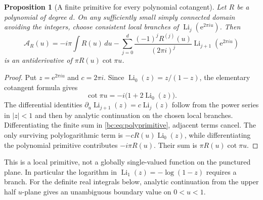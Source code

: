 \documentclass[11pt,letterpaper]{article}
\numberwithin{equation}{section}
\newtheorem{proposition}[theorem]{Proposition}
\theoremstyle{definition}
\theoremstyle{remark}
\newcommand{\bcLi}{\operatorname{Li}}
\newcommand{\bce}{\mathrm e}
\begin{document}
\begin{proposition}[A finite primitive for every polynomial cotangent]
\label{bc:prop:polyprimitive}
Let $R$ be a polynomial of degree $d$. On any sufficiently small simply
connected domain avoiding the integers, choose consistent local
branches of $\bcLi_j(\bce^{2\pi i u})$. Then
\begin{equation}\label{bc:eq:polyprimitive}
 \mathcal A_R(u)=
 -i\pi\int R(u)\,du
 -\sum_{j=0}^{d}\frac{(-1)^jR^{(j)}(u)}{(2\pi i)^j}
                       \bcLi_{j+1}(\bce^{2\pi i u})
\end{equation}
is an antiderivative of $\pi R(u)\cot\pi u$.
\end{proposition}
\begin{proof}
Put $z=\bce^{2\pi i u}$ and $c=2\pi i$. Since
$\bcLi_0(z)=z/(1-z)$, the elementary cotangent formula gives
\[
 \cot\pi u=-i\bigl(1+2\bcLi_0(z)\bigr).
\]
The differential identities
$\partial_u\bcLi_{j+1}(z)=c\bcLi_j(z)$ follow from the power series
in $|z|<1$ and then by analytic continuation on the chosen local
branches. Differentiating the finite sum in
\eqref{bc:eq:polyprimitive}, adjacent terms cancel. The only surviving
polylogarithmic term is $-cR(u)\bcLi_0(z)$, while differentiating the
polynomial primitive contributes $-i\pi R(u)$. Their sum is
$\pi R(u)\cot\pi u$.
\end{proof}

This is a local primitive, not a globally single-valued function on the
punctured plane. In particular the logarithm in $\bcLi_1(z)=-\log(1-z)$
requires a branch. For the definite real integrals below, analytic
continuation from the upper half $u$-plane gives an unambiguous boundary
value on $0<u<1$.
\end{document}
